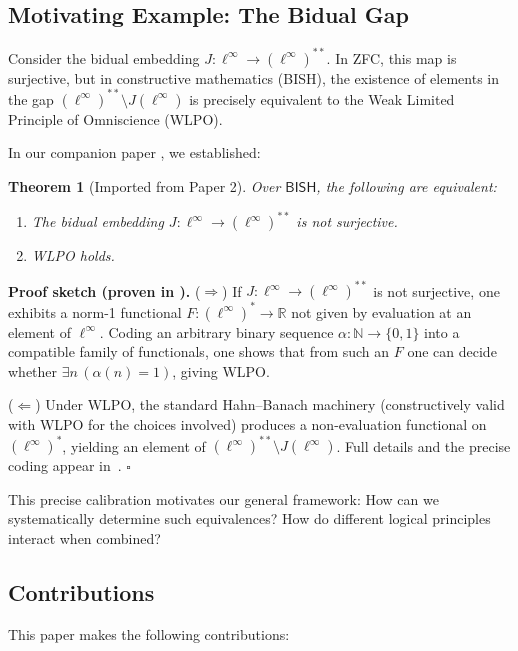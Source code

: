 \documentclass[11pt]{article}
\newtheorem{theorem}{Theorem}[section]
\newenvironment{proof}[1][Proof]{\noindent\textbf{#1.}\hspace{0.5em}}{\hfill$\square$\par}
\newcommand{\N}{\mathbb{N}}
\newcommand{\R}{\mathbb{R}}
\newcommand{\BISH}{\mathsf{BISH}}
\newcommand{\linf}{\ell^\infty}
\begin{document}
\subsection{Motivating Example: The Bidual Gap}

Consider the bidual embedding $J: \linf \to (\linf)^{**}$. In ZFC, this map is surjective, but in constructive mathematics (BISH), the existence of elements in the gap $(\linf)^{**} \setminus J(\linf)$ is precisely equivalent to the Weak Limited Principle of Omniscience (WLPO).

In our companion paper \cite{Paper2}, we established:

\begin{theorem}[Imported from Paper 2]\label{thm:paper2}
Over $\BISH$, the following are equivalent:
\begin{enumerate}
\item The bidual embedding $J: \linf \to (\linf)^{**}$ is not surjective.
\item WLPO holds.
\end{enumerate}
\end{theorem}

\begin{proof}[Proof sketch (proven in \cite{Paper2})]
($\Rightarrow$) If $J:\linf\to(\linf)^{**}$ is not surjective, one exhibits a norm-1 functional
$F:(\linf)^{*}\to\R$ not given by evaluation at an element of $\linf$. Coding an arbitrary binary
sequence $\alpha:\N\to\{0,1\}$ into a compatible family of functionals, one shows that from such an
$F$ one can decide whether $\exists n\,(\alpha(n)=1)$, giving WLPO.

($\Leftarrow$) Under WLPO, the standard Hahn--Banach machinery (constructively valid with WLPO for
the choices involved) produces a non-evaluation functional on $(\linf)^{*}$, yielding an element of
$(\linf)^{**}\setminus J(\linf)$. Full details and the precise coding appear in~\cite{Paper2}.
\end{proof}

This precise calibration motivates our general framework: How can we systematically determine such equivalences? How do different logical principles interact when combined?

\subsection{Contributions}

This paper makes the following contributions:
\end{document}
